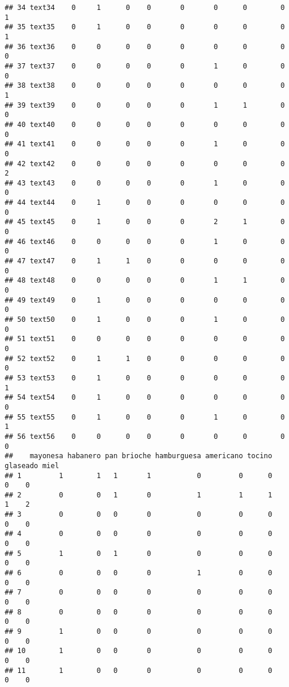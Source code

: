 \documentclass[
]{article}
\begin{document}
\begin{verbatim}
## 34 text34    0     1      0    0       0       0      0        0      1
## 35 text35    0     1      0    0       0       0      0        0      1
## 36 text36    0     0      0    0       0       0      0        0      0
## 37 text37    0     0      0    0       0       1      0        0      0
## 38 text38    0     0      0    0       0       0      0        0      1
## 39 text39    0     0      0    0       0       1      1        0      0
## 40 text40    0     0      0    0       0       0      0        0      0
## 41 text41    0     0      0    0       0       1      0        0      0
## 42 text42    0     0      0    0       0       0      0        0      2
## 43 text43    0     0      0    0       0       1      0        0      0
## 44 text44    0     1      0    0       0       0      0        0      0
## 45 text45    0     1      0    0       0       2      1        0      0
## 46 text46    0     0      0    0       0       1      0        0      0
## 47 text47    0     1      1    0       0       0      0        0      0
## 48 text48    0     0      0    0       0       1      1        0      0
## 49 text49    0     1      0    0       0       0      0        0      0
## 50 text50    0     1      0    0       0       1      0        0      0
## 51 text51    0     0      0    0       0       0      0        0      0
## 52 text52    0     1      1    0       0       0      0        0      0
## 53 text53    0     1      0    0       0       0      0        0      1
## 54 text54    0     1      0    0       0       0      0        0      0
## 55 text55    0     1      0    0       0       1      0        0      1
## 56 text56    0     0      0    0       0       0      0        0      0
##    mayonesa habanero pan brioche hamburguesa americano tocino glaseado miel
## 1         1        1   1       1           0         0      0        0    0
## 2         0        0   1       0           1         1      1        1    2
## 3         0        0   0       0           0         0      0        0    0
## 4         0        0   0       0           0         0      0        0    0
## 5         1        0   1       0           0         0      0        0    0
## 6         0        0   0       0           1         0      0        0    0
## 7         0        0   0       0           0         0      0        0    0
## 8         0        0   0       0           0         0      0        0    0
## 9         1        0   0       0           0         0      0        0    0
## 10        1        0   0       0           0         0      0        0    0
## 11        1        0   0       0           0         0      0        0    0

\end{verbatim}
\end{document}
